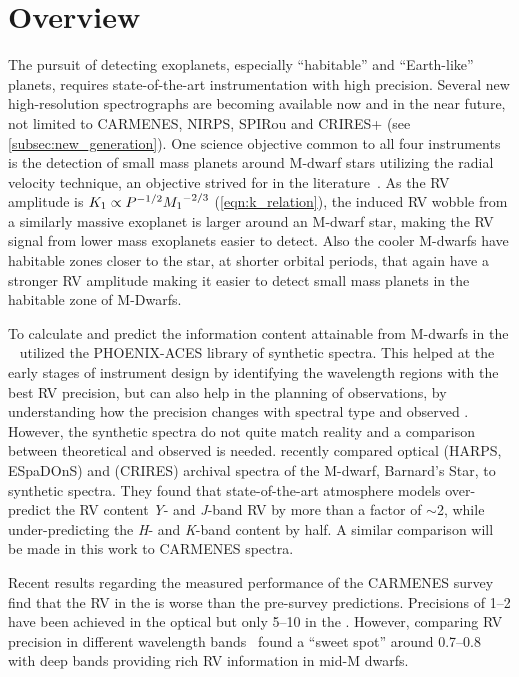 \section{Overview}
\label{sec:precision_overview}
The pursuit of detecting exoplanets, especially ``habitable'' and ``Earth-like'' planets, requires state-of-the-art instrumentation with high precision.
Several new high-resolution \nir{} spectrographs are becoming available now and in the near future, not limited to {CARMENES}, {NIRPS}, {SPIRou} and {CRIRES+} (see \cref{subsec:new_generation}).
One science objective common to all four instruments is the detection of small mass planets around {M-dwarf} stars utilizing the radial velocity technique, an objective strived for in the literature~\citep[e.g.][]{reiners_detecting_2010, rodler_detecting_2011, plavchan_radial_2015}.
As the {RV} amplitude is \({K}_{1}\propto {P}^{-{1/2}}{{M}_{1}}^{-2/3}\) (\cref{eqn:k_relation}), the induced {RV} wobble from a similarly massive exoplanet is larger around an M-dwarf star, making the {RV} signal from lower mass exoplanets easier to detect.
Also the cooler {M-dwarfs} have habitable zones closer to the star, at shorter orbital periods, that again have a stronger {RV} amplitude making it easier to detect small mass planets in the habitable zone of {M-Dwarfs}.

To calculate and predict the information content attainable from {M-dwarfs} in the \nir{,}~\citet{figueira_radial_2016} utilized the {PHOENIX-ACES} library of synthetic spectra.
This helped at the early stages of instrument design by identifying the wavelength regions with the best {RV} precision, but can also help in the planning of observations, by understanding how the precision changes with spectral type and observed {\snr{}}.
However, the synthetic spectra do not quite match reality and a comparison between theoretical and observed is needed.
\citet{artigau_optical_2018} recently compared optical ({HARPS}, {ESpaDOnS}) and \nir{} ({CRIRES}) archival spectra of the {M-dwarf}, Barnard's Star, to synthetic spectra.
They found that state-of-the-art atmosphere models over-predict the {RV} content \emph{Y}- and \emph{J}-band {RV} by more than a factor of \(\sim\)2, while under-predicting the \emph{H}- and \emph{K}-band content by half.
A similar comparison will be made in this work to {CARMENES} spectra.

Recent results regarding the measured performance of the {CARMENES} survey~\citep{reiners_carmenes_2018,quirrenbach_carmenes_2018} find that the {RV} in the \nir{} is worse than the pre-survey predictions.
Precisions of 1--2\mps{} have been achieved in the optical but only 5--10\mps{} in the \nir{}.
However, comparing {RV} precision in different wavelength bands~\citet{quirrenbach_carmenes_2018} found a ``sweet spot'' around 0.7--0.8\um{} with deep  bands providing rich {RV} information in mid-M dwarfs.

